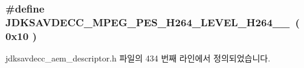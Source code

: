 \subsubsection[{\texorpdfstring{J\+D\+K\+S\+A\+V\+D\+E\+C\+C\+\_\+\+M\+P\+E\+G\+\_\+\+P\+E\+S\+\_\+\+H264\+\_\+\+L\+E\+V\+E\+L\+\_\+\+H264\+\_\+5\+\_\+2}{JDKSAVDECC_MPEG_PES_H264_LEVEL_H264_5_2}}]{\setlength{\rightskip}{0pt plus 5cm}\#define J\+D\+K\+S\+A\+V\+D\+E\+C\+C\+\_\+\+M\+P\+E\+G\+\_\+\+P\+E\+S\+\_\+\+H264\+\_\+\+L\+E\+V\+E\+L\+\_\+\+H264\+\_\+\_~( 0x10 )}\hypertarget{group__mpeg__pes__h264__level_ga39a69417a79395f02f888db07b2eb9cd}{}\label{group__mpeg__pes__h264__level_ga39a69417a79395f02f888db07b2eb9cd}


jdksavdecc\+\_\+aem\+\_\+descriptor.\+h 파일의 434 번째 라인에서 정의되었습니다.

